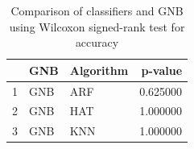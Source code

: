 \begin{table}
\footnotesize
\caption{Comparison of classifiers and GNB using Wilcoxon signed-rank test for accuracy}
\label{tab:GNB wilcoxon ACC comparison}
\begin{tabular}{lllr}
\hline
 & GNB & Algorithm & p-value \\
\hline
1 & GNB & ARF & 0.625000 \\
2 & GNB & HAT & 1.000000 \\
3 & GNB & KNN & 1.000000 \\
\hline
\end{tabular}
\end{table}
